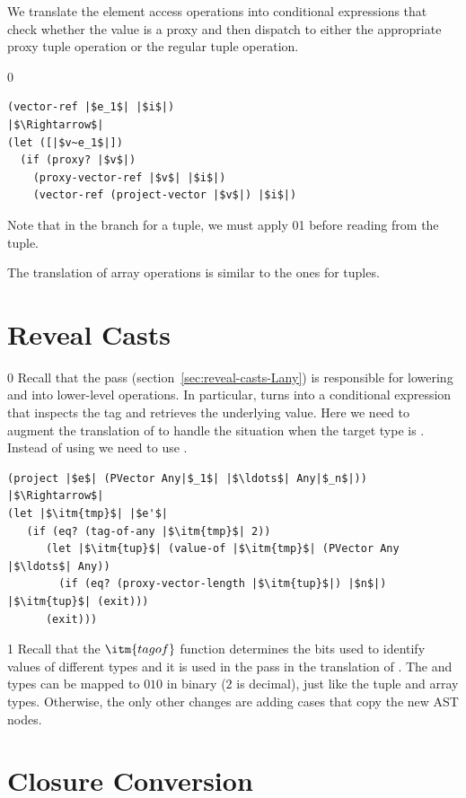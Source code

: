 \documentclass[7x10]{TimesAPriori_MIT}%
\def\racketEd{0}
\def\pythonEd{1}
\def\edition{0}
\newcommand{\racket}[1]{{\if\edition\racketEd{#1}\fi}}
\newcommand{\python}[1]{{\if\edition\pythonEd #1\fi}}
\numberwithin{theorem}{chapter}
\numberwithin{definition}{chapter}
\numberwithin{equation}{chapter}
\begin{document}
We translate the element access operations into conditional
expressions that check whether the value is a proxy and then dispatch
to either the appropriate proxy tuple operation or the regular tuple
operation.
{\if\edition\racketEd    
\begin{lstlisting}
(vector-ref |$e_1$| |$i$|)
|$\Rightarrow$|
(let ([|$v~e_1$|])
  (if (proxy? |$v$|)
    (proxy-vector-ref |$v$| |$i$|)
    (vector-ref (project-vector |$v$|) |$i$|)
\end{lstlisting}
\fi}
%
Note that in the branch for a tuple, we must apply
\racket{}\python{} before reading
from the tuple.

The translation of array operations is similar to the ones for tuples.


\section{Reveal Casts}
\label{sec:reveal-casts-gradual}

{\if\edition\racketEd    
Recall that the  pass
(section~\ref{sec:reveal-casts-Lany}) is responsible for lowering
 and  into lower-level operations.
%
In particular,  turns into a conditional expression that
inspects the tag and retrieves the underlying value.  Here we need to
augment the translation of  to handle the situation when
the target type is .  Instead of using
 we need to use .
\begin{lstlisting}
(project |$e$| (PVector Any|$_1$| |$\ldots$| Any|$_n$|))
|$\Rightarrow$|
(let |$\itm{tmp}$| |$e'$|
   (if (eq? (tag-of-any |$\itm{tmp}$| 2))
      (let |$\itm{tup}$| (value-of |$\itm{tmp}$| (PVector Any |$\ldots$| Any))
        (if (eq? (proxy-vector-length |$\itm{tup}$|) |$n$|) |$\itm{tup}$| (exit)))
      (exit)))
\end{lstlisting}
\fi}
%
{\if\edition\pythonEd
Recall that the $\itm{tagof}$ function determines the bits used to
identify values of different types and it is used in the 
pass in the translation of . The \PTUPLETYNAME{} and
\PARRAYTYNAME{} types can be mapped to $010$ in binary ($2$ is
decimal), just like the tuple and array types.
\fi}  
%
Otherwise, the only other changes are adding cases that copy the new AST nodes.


\section{Closure Conversion}
\label{sec:closure-conversion-gradual}
\end{document}
